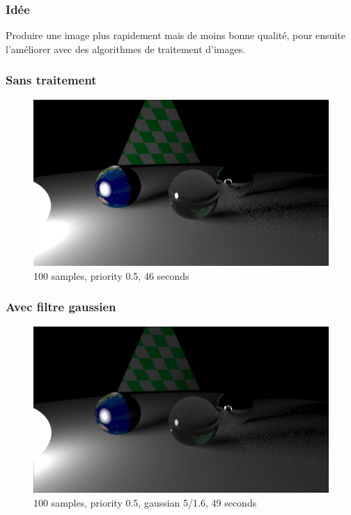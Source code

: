 \documentclass[handout]{beamer}
\begin{document}
\begin{frame}
    \frametitle{Idée}
    Produire une image plus rapidement mais de moins bonne qualité, pour ensuite l'améliorer avec des algorithmes de traitement d'images.
\end{frame}

\begin{frame}
    \frametitle{Sans traitement}

    \begin{figure}
        \includegraphics[scale=0.25]{priorisation.png}
        \caption{100 samples, priority 0.5, 46 seconds}
    \end{figure}

\end{frame}

\begin{frame}
    \frametitle{Avec filtre gaussien}

    \begin{figure}
        \includegraphics[scale=0.25]{gaussian5.png}
        \caption{100 samples, priority 0.5, gaussian 5/1.6, 49 seconds}
    \end{figure}

\end{frame}
\end{document}
